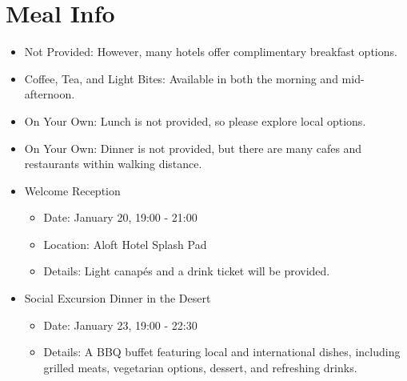 \chapter{Meal Info}
\vspace*{-0.2cm}
\begin{itemize}[noitemsep]
    \item Not Provided: However, many hotels offer complimentary breakfast options.
\end{itemize}

\vspace*{-0.2cm}
\begin{itemize}[noitemsep]
    \item Coffee, Tea, and Light Bites: Available in both the morning and mid-afternoon.
\end{itemize}

\vspace*{-0.2cm}
\begin{itemize}[noitemsep]
    \item On Your Own: Lunch is not provided, so please explore local options.
\end{itemize}

\vspace*{-0.2cm}
\begin{itemize}[noitemsep]
    \item On Your Own: Dinner is not provided, but there are many cafes and restaurants within walking distance.
\end{itemize}

\noindent\hrulefill
{}
\vspace*{-0.2cm}
\begin{itemize}[noitemsep]
\item Welcome Reception
\begin{itemize}[noitemsep]
\item Date: January 20, 19:00 - 21:00
\item Location: Aloft Hotel Splash Pad
\item Details: Light canapés and a drink ticket will be provided.
\end{itemize}

\item Social Excursion Dinner in the Desert
\begin{itemize}[noitemsep]
\item Date: January 23, 19:00 - 22:30
\item Details: A BBQ buffet featuring local and international dishes, including grilled meats, vegetarian options, dessert, and refreshing drinks.
\end{itemize}
\end{itemize}
